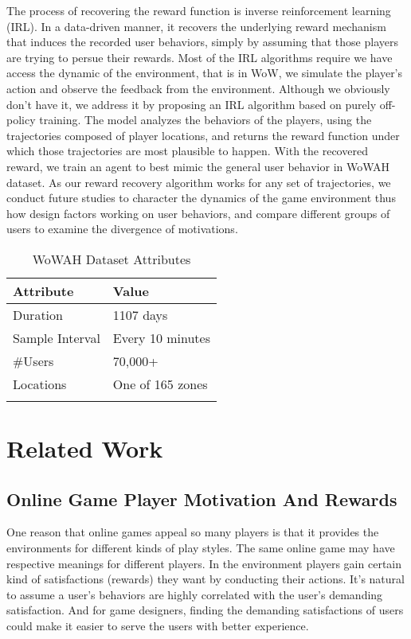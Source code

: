 \documentclass{sigchi}
\begin{document}
The process of recovering the reward function is inverse reinforcement learning (IRL). In a data-driven manner, it recovers the underlying reward mechanism that induces the recorded user behaviors, simply by assuming that those players are trying to persue their rewards. Most of the IRL algorithms require we have access the dynamic of the environment, that is in WoW, we simulate the player's action and observe the feedback from the environment. Although we obviously don't have it, we address it by proposing an IRL algorithm based on purely off-policy training. The model analyzes the behaviors of the players, using the trajectories composed of player locations, and returns the reward function under which those trajectories are most plausible to happen. With the recovered reward, we train an agent to best mimic the general user behavior in WoWAH dataset. As our reward recovery algorithm works for any set of trajectories, we conduct future studies to character the dynamics of the game environment thus how design factors working on user behaviors, and compare different groups of users to examine the divergence of motivations. 

\begin{table}
\caption{WoWAH Dataset Attributes}
\begin{tabularx}{\textwidth}{lX}
    Attribute & Value \\
    \midrule
    Duration & 1107 days \\
    Sample Interval & Every 10 minutes \\
    \#Users & 70,000+ \\
    Locations & One of 165 zones \\
    \label{tbl:wowah}
\end{tabularx}
\end{table}

\section{Related Work}

\subsection{Online Game Player Motivation And Rewards}

One reason that online games appeal so many players is that it provides the environments for different kinds of play styles. The same online game may have respective meanings for different players. In the environment players gain certain kind of satisfactions (rewards) they want by conducting their actions. It's natural to assume a user's behaviors are highly correlated with the user's demanding satisfaction. And for game designers, finding the demanding satisfactions of users could make it easier to serve the users with better experience. 
\end{document}
